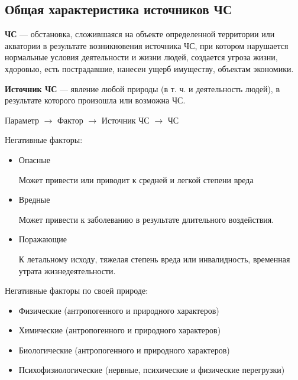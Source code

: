 \documentclass[oneside,final,14pt]{extreport}
\begin{document}
\subsection*{Общая характеристика источников ЧС}
\textbf{ЧС} --- обстановка, сложившаяся на объекте определенной территории или акватории в результате возникновения источника ЧС, при котором нарушается нормальные условия деятельности и жизни людей, создается угроза жизни, хдоровью, есть пострадавшие, нанесен ущерб имуществу, объектам экономики.

\textbf{Источник ЧС} --- явление любой природы (в т. ч. и деятельность людей), в результате которого произошла или возможна ЧС.

Параметр $\to$ Фактор $\to$ Источник ЧС $\to$ ЧС

Негативные факторы:
\begin{itemize}
	\item Опасные
	
	Может привести или приводит к средней и легкой степени вреда
	
	\item Вредные
	
	Может привести к заболеванию в результате длительного воздействия.
	
	\item Поражающие
	
	К летальному исходу, тяжелая степень вреда или инвалидность, временная утрата жизнедеятельности. 
\end{itemize}
Негативные факторы по своей природе:
\begin{itemize}
	\item Физические (антропогенного и природного характеров)
	\item Химические (антропогенного и природного характеров)
	\item Биологические (антропогенного и природного характеров)
	\item Психофизиологические (нервные, психические и физические перегрузки)
\end{itemize}
\end{document}

